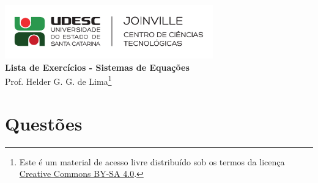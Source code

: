 \documentclass[12pt,a4paper]{article}
\author{\eu}
\title{\tipo}
\date{\data}
\newcommand{\IconPc}{\texttt{[image: computer.png]}}
\newcommand{\IconCalc}{\texttt{[image: calculator.png]}}
\newcommand{\IconThink}{\texttt{[image: pencil.png]}}
\newcommand{\IconCheck}{\texttt{[image: checkmark.png]}}
\newlength{\SmileysLength}
\newcommand{\calc}{\hspace*{-\SmileysLength}\makebox[0pt][r]{\IconCalc}%
   \hspace*{\SmileysLength}}
\newcommand{\software}{\hspace*{-\SmileysLength}\makebox[0pt][r]{\IconPc}%
   \hspace*{\SmileysLength}}
\newcommand{\teoria}{\hspace*{-\SmileysLength}\makebox[0pt][r]{\IconThink}%
   \hspace*{\SmileysLength}}
\newcommand{\conceito}{\hspace*{-\SmileysLength}\makebox[0pt][r]{\IconCheck}%
   \hspace*{\SmileysLength}}
\newcommand*\tipo{Lista de Exercícios - Sistemas de Equações}
\newcommand*\eu{Helder G. G. de Lima}
\begin{document}
\begin{center}
\includegraphics[width=9.0cm]{marca} \\
\textbf{\tipo} \\
Prof. \eu\footnote{
Este é um material de acesso livre distribuído sob os termos da licença \href{https://creativecommons.org/licenses/by-sa/4.0/deed.pt_BR}{Creative Commons BY-SA 4.0}.}
\end{center}


\section*{Questões}
\end{document}
